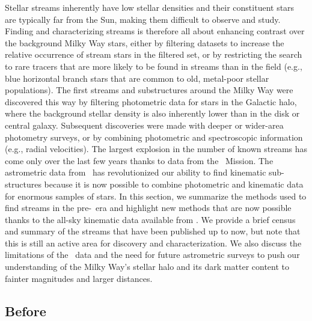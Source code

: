 \documentclass[final,5p,times,twocolumn,authoryear]{elsarticle}
\begin{document}
Stellar streams inherently have low stellar densities and their constituent stars are
typically far from the Sun, making them difficult to observe and study.
Finding and characterizing streams is therefore all about enhancing contrast over the
background Milky Way stars, either by filtering datasets to increase the relative
occurrence of stream stars in the filtered set, or by restricting the search to rare
tracers that are more likely to be found in streams than in the field (e.g., blue
horizontal branch stars that are common to old, metal-poor stellar populations).
The first streams and substructures around the Milky Way were discovered this way by
filtering photometric data for stars in the Galactic halo, where the background stellar
density is also inherently lower than in the disk or central galaxy.
Subsequent discoveries were made with deeper or wider-area photometry surveys, or by
combining photometric and spectroscopic information (e.g., radial velocities).
The largest explosion in the number of known streams has come only over the last few
years thanks to data from the \gaia\ Mission.
The astrometric data from \gaia\ has revolutionized our ability to find kinematic
sub-structures because it is now possible to combine photometric and kinematic data for
enormous samples of stars.
In this section, we summarize the methods used to find streams in the pre-\gaia\ era and
highlight new methods that are now possible thanks to the all-sky kinematic data
available from \gaia.
We provide a brief census and summary of the streams that have been published up to now,
but note that this is still an active area for discovery and characterization.
We also discuss the limitations of the \gaia\ data and the need for future astrometric
surveys to push our understanding of the Milky Way's stellar halo and its dark matter
content to fainter magnitudes and larger distances.


\subsection{Before \gaia}
\end{document}
